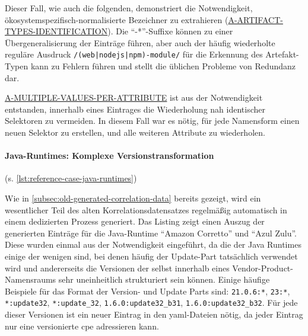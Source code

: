 Dieser Fall, wie auch die folgenden, demonstriert die Notwendigkeit, ökosystemspezifisch-normalisierte Bezeichner zu extrahieren (\hyperref[subsec:req-type-specific-matching]{A-ARTIFACT-TYPES-IDENTIFICATION}).
Die \enquote{-*}-Suffixe können zu einer Übergeneralisierung der Einträge führen, aber auch der häufig wiederholte reguläre Ausdruck \texttt{/(web|nodejs|npm)-module/} für die Erkennung des Artefakt-Typen kann zu Fehlern führen und stellt die üblichen Probleme von Redundanz dar.

\hyperref[subsec:req-multiple-attribute-values]{A-MULTIPLE-VALUES-PER-ATTRIBUTE} ist aus der Notwendigkeit entstanden, innerhalb eines Eintrages die Wiederholung nah identischer Selektoren zu vermeiden.
In diesem Fall war es nötig, für jede Namensform einen neuen Selektor zu erstellen, und alle weiteren Attribute zu wiederholen.

\paragraph{Java-Runtimes: Komplexe Versionstransformation}\label{par:reference-case-java-runtimes} (s. \autoref{lst:reference-case-java-runtimes})

Wie in \autoref{subsec:old-generated-correlation-data} bereits gezeigt, wird ein wesentlicher Teil des alten Korrelationsdatensatzes regelmäßig automatisch in einem dedizierten Prozess generiert.
Das Listing zeigt einen Auszug der generierten Einträge für die Java-Runtime \enquote{Amazon Corretto} und \enquote{Azul Zulu}.
Diese wurden einmal aus der Notwendigkeit eingeführt, da die  der Java Runtimes einige der wenigen sind, bei denen häufig der Update-Part tatsächlich verwendet wird und andererseits die Versionen der  selbst innerhalb eines Vendor-Product-Namensraums sehr uneinheitlich strukturiert sein können.
Einige häufige Beispiele für das Format der Version- und Update Parts sind: \texttt{21.0.6:*}, \texttt{23:*}, \texttt{*:update32}, \texttt{*:update\_32}, \texttt{1.6.0:update32\_b31}, \texttt{1.6.0:update32\_b32}.
Für jede dieser Versionen ist ein neuer Eintrag in den \acrshort{yaml}-Dateien nötig, da jeder Eintrag nur eine versionierte \acrshort{cpe} adressieren kann.

